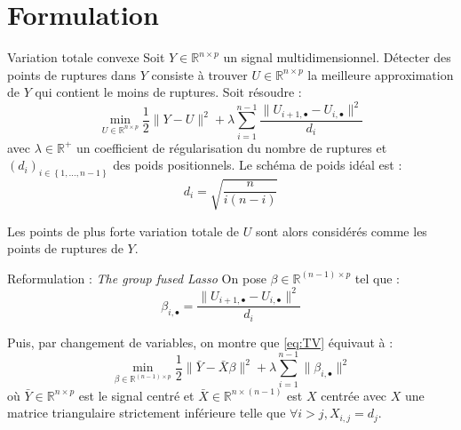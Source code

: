 \documentclass{beamer}
\theoremstyle{definition}
\newcommand{\RR}{\ensuremath{\mathbb{R}}}
\newcommand{\Zseq}[2]{\ensuremath{\left\{#1 , \dots, #2\right\}}}
\begin{document}
\section{Formulation}
	\begin{frame}[allowframebreaks]{\insertsection}
		\begin{block}{Variation totale convexe}
			Soit $Y\in\RR^{n\times p}$ un signal multidimensionnel. Détecter des points de ruptures dans $Y$ consiste à trouver $U\in\RR^{n\times p}$ la meilleure approximation de $Y$ qui contient le moins de ruptures. Soit résoudre :
			\begin{equation}
				\label{eq:TV}
				\min_{U\in\RR^{n\times p}} \frac{1}{2} \lVert Y - U \rVert^2 + \lambda \sum_{i=1}^{n-1}\frac{\lVert U_{i+1,\bullet} - U_{i,\bullet} \rVert^2}{d_i}
			\end{equation}	
			avec $\lambda \in \RR^+$ un coefficient de régularisation du nombre de ruptures et $(d_i)_{i \in \Zseq{1}{n-1}}$ des poids positionnels. Le schéma de poids idéal est :
			\begin{equation}
				d_i=\sqrt{\frac{n}{i(n-i)}}
			\end{equation}
		\end{block}
		Les points de plus forte variation totale de $U$ sont alors considérés comme les points de ruptures de $Y$.
			 
		\begin{block}{Reformulation : \textit{The group fused Lasso}}
			On pose $\beta \in \RR^{(n-1) \times p}$ tel que :
			\begin{equation}
				\beta_{i, \bullet} = \frac{\lVert U_{i+1,\bullet} - U_{i,\bullet} \rVert^2}{d_i}
			\end{equation}
			
			Puis, par changement de variables, on montre que \eqref{eq:TV} équivaut à :
			\begin{equation}
				\min_{\beta \in \RR^{(n-1) \times p}} \frac{1}{2} \lVert \bar{Y} - \bar{X} \beta \rVert^2 + \lambda \sum_{i=1}^{n-1} \lVert \beta_{i, \bullet} \rVert^2
			\end{equation}
			où $\bar{Y} \in \RR^{n \times p}$ est le signal centré et $\bar{X} \in \RR^{n \times (n-1)}$ est $X$ centrée avec $X$ une matrice triangulaire strictement inférieure telle que $\forall i>j, X_{i,j}=d_j$.
		\end{block}
	
		
	\end{frame}
\end{document}
